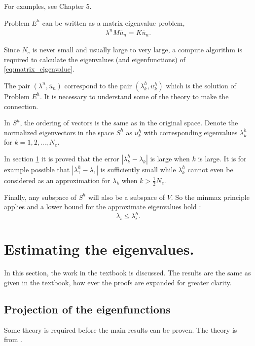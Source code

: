 \documentclass[../../main.tex]{subfiles}
\begin{document}
For examples, see Chapter 5.

Problem $E^h$ can be written as a matrix eigenvalue problem,
\begin{eqnarray}
	\lambda^nM\bar{u}_n = K\bar{u}_n. \label{eq:matrix_eigenvalue}
\end{eqnarray} 

Since $N_e$ is never small and usually large to very large, a compute algorithm is required to calculate the eigenvalues (and eigenfunctions) of \eqref{eq:matrix_eigenvalue}.

The pair $(\lambda^n, \bar{u}_n)$ correspond to the pair $(\lambda^h_k, u^h_k)$ which is the solution of Problem $E^h$. It is necessary to understand some of the theory to make the connection.

In $S^h$, the ordering of vectors is the same as in the original space. Denote the normalized eigenvectors in the space $S^h$ as $u^h_k$ with corresponding eigenvalues $\lambda^h_k$ for $k = 1,2,...,N_e$.

In section \ref{sec:estimating_the_eigenvalues} it is proved that the error $| \lambda_k^h - \lambda_k|$ is large when $k$ is large. It is for example possible that $|\lambda^h_1 - \lambda_1|$ is sufficiently small while $\lambda^h_k$ cannot even be considered as an approximation for $\lambda_k$ when $\displaystyle k > \frac{1}{2}N_e$.

Finally, any subspace of $S^h$ will also be a subspace of $V$. So the minmax principle applies and a lower bound for the approximate eigenvalues hold \cite{SF73}:
\begin{equation}
	\lambda_i \leq \lambda_i^h.
\end{equation}

\section{Estimating the eigenvalues.} \label{sec:estimating_the_eigenvalues}
In this section, the work in the textbook \cite{SF73} is discussed. The results are the same as given in the textbook, how ever the proofs are expanded for greater clarity.

\subsection{Projection of the eigenfunctions}

Some theory is required before the main results can be proven. The theory is from \cite{SF73}.
\end{document}
